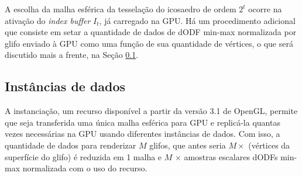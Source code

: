 A escolha da malha esférica da tesselação do icosaedro de ordem $2^t$ ocorre na ativação do \textit{index buffer} $I_t$, já carregado na GPU. Há um procedimento adicional que consiste em setar a quantidade de dados de dODF min-max normalizada por glifo enviado à GPU como uma função de sua quantidade de vértices, o que será discutido mais a frente, na Seção \ref{ssec::atributos}.







\subsection{Instâncias de dados}
\label{ssec::atributos}

A instanciação, um recurso disponível a partir da versão 3.1 de OpenGL, permite que seja transferida uma única malha esférica para GPU e replicá-la quantas vezes necessárias na GPU usando diferentes instâncias de dados. Com isso, a quantidade de dados para renderizar $M$ glifos, que antes seria $M \times$ (vértices da superfície do glifo) é reduzida em 1 malha e $M$ $\times$ amostras escalares dODFs min-max normalizada com o uso do recurso.%

